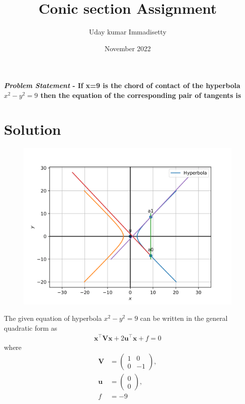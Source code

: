 \documentclass[journal,10pt,twocolumn]{article}
\title{\textbf{Conic section Assignment}}
\author{Uday kumar Immadisetty}
\date{November 2022}
\let\vec\mathbf
\newcommand{\myvec}[1]{\ensuremath{\begin{pmatrix}#1\end{pmatrix}}}
\begin{document}
\maketitle
\paragraph{\textit{Problem Statement} - If x=9 is the chord of contact of the hyperbola $x^2-y^2=9$ then the equation of the corresponding pair of tangents is}

\section*{\large Solution}

\begin{figure}[h]
\centering
\includegraphics[width=1\columnwidth]{conics1-1.png}

\caption{}
\label{fig:parabola}
\end{figure}

The given equation of hyperbola $x^2-y^2 = 9$ can be written in the general quadratic form as
\begin{align}
    \label{eq:conic_quad_form}
    \vec{x}^{\top}\vec{V}\vec{x}+2\vec{u}^{\top}\vec{x}+f=0
    \end{align}
where
\begin{align}
  \label{eq:V_matrix}
  \vec{V} &= \myvec{1 & 0\\0 & -1},
  \\
  \label{eq:u_vector}
  \vec{u} &= \myvec{0\\0},
  \\
  \label{eq:f_value}
  f &= -9
\end{align}
\end{document}
